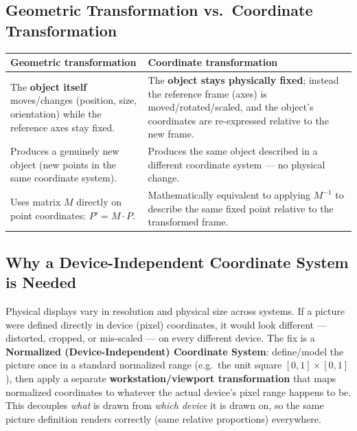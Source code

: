 \documentclass[12pt, a4paper]{article}
\newenvironment{answerbox}{\begin{mdframed}[style=answerframe]}{\end{mdframed}}
\begin{document}
\subsection{Geometric Transformation vs.\ Coordinate Transformation}
\begin{center}
\renewcommand{\arraystretch}{1.4}
\begin{tabular}{p{5.3cm}p{5.3cm}}
\toprule
\textbf{Geometric transformation} & \textbf{Coordinate transformation} \\
\midrule
The \textbf{object itself} moves/changes (position, size, orientation) while the reference axes stay fixed. & The \textbf{object stays physically fixed}; instead the reference frame (axes) is moved/rotated/scaled, and the object's coordinates are re-expressed relative to the new frame. \\
Produces a genuinely new object (new points in the same coordinate system). & Produces the same object described in a different coordinate system --- no physical change. \\
Uses matrix $M$ directly on point coordinates: $P'=M\cdot P$. & Mathematically equivalent to applying $M^{-1}$ to describe the same fixed point relative to the transformed frame. \\
\bottomrule
\end{tabular}
\end{center}

\subsection{Why a Device-Independent Coordinate System is Needed}
\begin{answerbox}
Physical displays vary in resolution and physical size across systems. If a picture were defined directly in device (pixel) coordinates, it would look different --- distorted, cropped, or mis-scaled --- on every different device. The fix is a \textbf{Normalized (Device-Independent) Coordinate System}: define/model the picture once in a standard normalized range (e.g.\ the unit square $[0,1]\times[0,1]$), then apply a separate \textbf{workstation/viewport transformation} that maps normalized coordinates to whatever the actual device's pixel range happens to be. This decouples \emph{what} is drawn from \emph{which device} it is drawn on, so the same picture definition renders correctly (same relative proportions) everywhere.
\end{answerbox}
\end{document}
